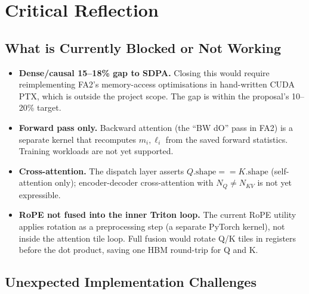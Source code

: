 \documentclass[12pt]{article}
\begin{document}
\section{Critical Reflection}

\subsection{What is Currently Blocked or Not Working}

\begin{itemize}[leftmargin=1.5em]
  \item \textbf{Dense/causal 15--18\% gap to SDPA.}  Closing this would
    require reimplementing FA2's memory-access optimisations in hand-written
    CUDA PTX, which is outside the project scope.  The gap is within the
    proposal's 10--20\% target.

  \item \textbf{Forward pass only.}  Backward attention (the ``BW dO'' pass
    in FA2) is a separate kernel that recomputes $m_i, \ell_i$ from the
    saved forward statistics.  Training workloads are not yet supported.

  \item \textbf{Cross-attention.}  The dispatch layer asserts
    $Q.\text{shape} == K.\text{shape}$ (self-attention only); encoder-decoder
    cross-attention with $N_Q \neq N_{KV}$ is not yet expressible.

  \item \textbf{RoPE not fused into the inner Triton loop.}  The current
    RoPE utility applies rotation as a preprocessing step (a separate
    PyTorch kernel), not inside the attention tile loop.  Full fusion would
    rotate Q/K tiles in registers before the dot product, saving one HBM
    round-trip for Q and K.
\end{itemize}

\subsection{Unexpected Implementation Challenges}
\end{document}
